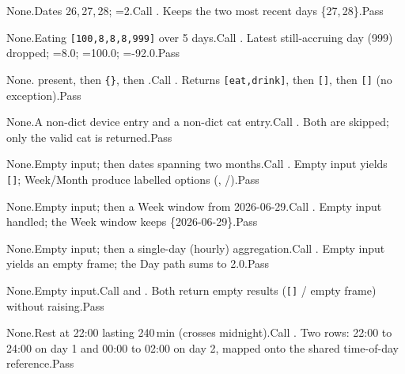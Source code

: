 {None.}{Dates 26,\,27,\,28; =2.}{Call .}
{Keeps the two most recent days \{27,\,28\}.}{Pass}

{None.}{Eating \texttt{[100,8,8,8,999]} over 5 days.}{Call .}
{Latest still-accruing day (999) dropped; =8.0; =100.0; =-92.0.}{Pass}

{None.}{ present, then \texttt{\{\}}, then .}{Call .}
{Returns \texttt{[eat,drink]}, then \texttt{[]}, then \texttt{[]} (no exception).}{Pass}

{None.}{A non-dict device entry and a non-dict cat entry.}{Call .}
{Both are skipped; only the valid cat is returned.}{Pass}

{None.}{Empty input; then dates spanning two months.}{Call .}
{Empty input yields \texttt{[]}; Week/Month produce labelled options (, /).}{Pass}

{None.}{Empty input; then a Week window from 2026-06-29.}{Call .}
{Empty input handled; the Week window keeps \{2026-06-29\}.}{Pass}

{None.}{Empty input; then a single-day (hourly) aggregation.}{Call .}
{Empty input yields an empty frame; the Day path sums to 2.0.}{Pass}

{None.}{Empty input.}{Call  and .}
{Both return empty results (\texttt{[]} / empty frame) without raising.}{Pass}

{None.}{Rest at 22:00 lasting 240\,min (crosses midnight).}{Call .}
{Two rows: 22:00 to 24:00 on day 1 and 00:00 to 02:00 on day 2, mapped onto the shared time-of-day reference.}{Pass}


